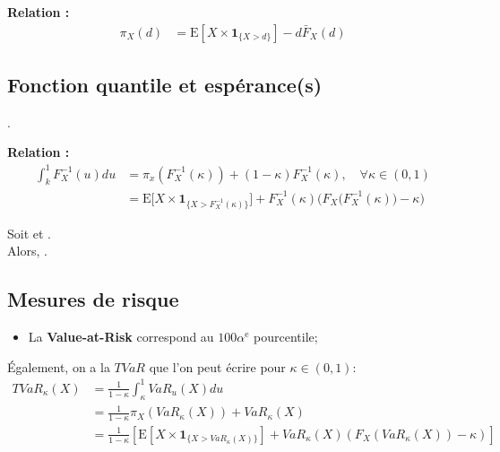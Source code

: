 \documentclass[10pt, french]{article}
\begin{document}
\begin{multicols*}{2}
\textbf{Relation :}
\begin{align*}
	\pi_{X}(d)
	&=	\text{E}[X	\times	\bm{1}_{\{X	>	d\}}]	-	d\bar{F}_{X}(d)
\end{align*}


\subsection{Fonction quantile et espérance(s)}
.

\textbf{Relation :}
\begin{align*}
	\int_{k}^{1}F_{X}^{-1}(u)du
	&=	\pi_{x}\left(F_{X}^{-1}(\kappa)\right) + (1 - \kappa)F_{X}^{-1}(\kappa), \quad \forall \kappa \in (0, 1)	\\
	&=	\text{E}\Big[X	\times	\bm{1}_{\{X	>	F_{X}^{-1}(\kappa)\}}\Big]+ 
		F_{X}^{-1}(\kappa)\bigg( F_{X}\Big(F_{X}^{-1}(\kappa)\Big)	-	\kappa \bigg)
\end{align*}

\begin{rappel_enhanced}
Soit  et .\\

Alors, .
\end{rappel_enhanced}

\subsection{Mesures de risque}
\begin{itemize}
	\item	La \textbf{Value-at-Risk} correspond au $100\alpha^{\text{e}}$ pourcentile;
\end{itemize}

Également, on a la $TVaR$ que l'on peut écrire pour $\kappa \in (0, 1)$: 
\begin{align*}
	TVaR_{\kappa}(X)
	&=	\frac{1}{1 - \kappa}\int_{\kappa}^{1}	VaR_{u}(X)du	\\
	&=	\frac{1}{1 - \kappa}\pi_{X}\left(VaR_{\kappa}(X)\right) + VaR_{\kappa}(X)	\\
	&=	\frac{1}{1 - \kappa}\left[	\text{E}[X \times \bm{1}_{\{X	>	VaR_{\kappa}(X)\}}] + VaR_{\kappa}(X) \left(F_{X}\left(VaR_{\kappa}(X)\right)	-	\kappa\right)	\right]
\end{align*}


\end{multicols*}
\end{document}
